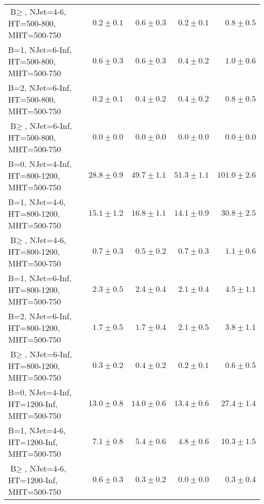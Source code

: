 \begin{table}
\begin{tabular}{l|r|r|r|r}
    $\text{B}\geq$, NJet=4-6, HT=500-800, MHT=500-750 &               $0.2\pm0.1$&               $0.6\pm0.3$&               $0.2\pm0.1$&                   $0.8\pm0.5$ \\ 
    B=1, NJet=6-Inf, HT=500-800, MHT=500-750 &               $0.6\pm0.3$&               $0.6\pm0.3$&               $0.4\pm0.2$&                   $1.0\pm0.6$ \\ 
    B=2, NJet=6-Inf, HT=500-800, MHT=500-750 &               $0.2\pm0.1$&               $0.4\pm0.2$&               $0.4\pm0.2$&                   $0.8\pm0.5$ \\ 
    $\text{B}\geq$, NJet=6-Inf, HT=500-800, MHT=500-750 &               $0.0\pm0.0$&               $0.0\pm0.0$&               $0.0\pm0.0$&                   $0.0\pm0.0$ \\ 
    B=0, NJet=4-Inf, HT=800-1200, MHT=500-750 &              $28.8\pm0.9$&              $49.7\pm1.1$&              $51.3\pm1.1$&                 $101.0\pm2.6$ \\ 
    B=1, NJet=4-6, HT=800-1200, MHT=500-750 &              $15.1\pm1.2$&              $16.8\pm1.1$&              $14.1\pm0.9$&                  $30.8\pm2.5$ \\ 
    $\text{B}\geq$, NJet=4-6, HT=800-1200, MHT=500-750 &               $0.7\pm0.3$&               $0.5\pm0.2$&               $0.7\pm0.3$&                   $1.1\pm0.6$ \\ 
    B=1, NJet=6-Inf, HT=800-1200, MHT=500-750 &               $2.3\pm0.5$&               $2.4\pm0.4$&               $2.1\pm0.4$&                   $4.5\pm1.1$ \\ 
    B=2, NJet=6-Inf, HT=800-1200, MHT=500-750 &               $1.7\pm0.5$&               $1.7\pm0.4$&               $2.1\pm0.5$&                   $3.8\pm1.1$ \\ 
    $\text{B}\geq$, NJet=6-Inf, HT=800-1200, MHT=500-750 &               $0.3\pm0.2$&               $0.4\pm0.2$&               $0.2\pm0.1$&                   $0.6\pm0.5$ \\ 
    B=0, NJet=4-Inf, HT=1200-Inf, MHT=500-750 &              $13.0\pm0.8$&              $14.0\pm0.6$&              $13.4\pm0.6$&                  $27.4\pm1.4$ \\ 
    B=1, NJet=4-6, HT=1200-Inf, MHT=500-750 &               $7.1\pm0.8$&               $5.4\pm0.6$&               $4.8\pm0.6$&                  $10.3\pm1.5$ \\ 
    $\text{B}\geq$, NJet=4-6, HT=1200-Inf, MHT=500-750 &               $0.6\pm0.3$&               $0.3\pm0.2$&               $0.0\pm0.0$&                   $0.3\pm0.4$ \\ 

\end{tabular}
\end{table}
